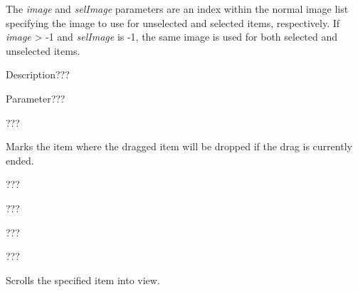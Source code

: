 The {\it image} and {\it selImage} parameters are an index within
the normal image list specifying the image to use for unselected and
selected items, respectively.
If {\it image} > -1 and {\it selImage} is -1, the same image is used for
both selected and unselected items.

\label{wxtreelistctrlrefresh}


Description???

Parameter???

\label{wxtreelistctrlsetbackgroundcolour}


???

\label{wxtreelistctrlsetdragitem}


Marks the item where the dragged item will be dropped if the drag is currently ended.

\label{wxtreelistctrlsetfocus}


???

\label{wxtreelistctrlsetfont}


???

\label{wxtreelistctrlsetforegroundcolour}


???

\label{wxtreelistctrlsetwindowstyle}


???

\label{wxtreelistctrlscrollto}


Scrolls the specified item into view.

